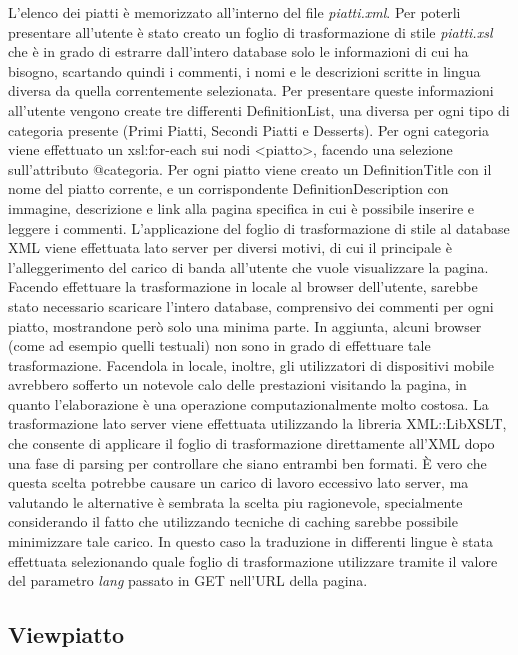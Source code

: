 \documentclass[10pt,a4paper,onecolumn]{article}
\begin{document}
L’elenco dei piatti è memorizzato all’interno del file \textit{piatti.xml}. Per poterli presentare all’utente è stato creato un foglio di trasformazione di stile \textit{piatti.xsl} che è in grado di estrarre dall’intero database solo le informazioni di cui ha bisogno, scartando quindi i commenti, i nomi e le descrizioni scritte in lingua diversa da quella correntemente selezionata.
Per presentare queste informazioni all’utente vengono create tre differenti DefinitionList, una diversa per ogni tipo di categoria presente (Primi Piatti, Secondi Piatti e Desserts).
Per ogni categoria viene effettuato un xsl:for-each sui nodi <piatto>, facendo una selezione sull’attributo @categoria. Per ogni piatto viene creato un DefinitionTitle con il nome del piatto corrente, e un corrispondente DefinitionDescription con immagine, descrizione e link alla pagina specifica in cui è possibile inserire e leggere i commenti.
L’applicazione del foglio di trasformazione di stile al database XML viene effettuata lato server per diversi motivi, di cui il principale è l'alleggerimento del carico di banda all’utente che vuole visualizzare la pagina. Facendo effettuare la trasformazione in locale al browser dell’utente, sarebbe stato necessario scaricare l’intero database, comprensivo dei commenti per ogni piatto, mostrandone però solo una minima parte. In aggiunta, alcuni browser (come ad esempio quelli testuali) non sono in grado di effettuare tale trasformazione. Facendola in locale, inoltre, gli utilizzatori di dispositivi mobile avrebbero sofferto un notevole calo delle prestazioni visitando la pagina, in quanto l’elaborazione è una operazione computazionalmente molto costosa.
La trasformazione lato server viene effettuata utilizzando la libreria XML::LibXSLT, che consente di applicare il foglio di trasformazione direttamente all’XML dopo una fase di parsing per controllare che siano entrambi ben formati.
\`E vero che questa scelta potrebbe causare un carico di lavoro eccessivo lato server, ma valutando le alternative è sembrata la scelta piu ragionevole, specialmente considerando il fatto che utilizzando tecniche di caching sarebbe possibile minimizzare tale carico.
In questo caso la traduzione in differenti lingue è stata effettuata selezionando quale foglio di trasformazione utilizzare tramite il valore del parametro \textit{lang} passato in GET nell’URL della pagina.

\subsection{Viewpiatto}
\end{document}

